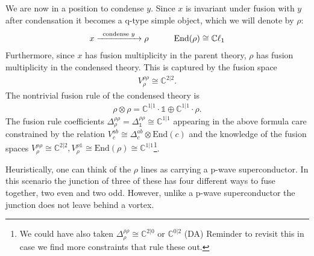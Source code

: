 \documentclass[12pt,a4paper]{article}
\newcounter{arrow}
\newcommand{\tp}{\otimes}
\newcommand{\unit}{\mathds{1}}
\newcommand{\cc}{\mathbb{C}}
\newcommand{\End}{\text{End}}
\newcommand{\dave}[1]{{\color{ao(english)}\footnotesize{(DA) #1}}}
\begin{document}
We are now in a position to condense $y$.
Since $x$ is invariant under fusion with $y$ after condensation it becomes a q-type simple object, which we will denote by $\rho$:
\begin{align}
x \xrightarrow{\;\; \text{condense $y$\;\;}} \rho \quad \quad \quad \text{End}(\rho) \cong \mathbb{C} \ell_1
\end{align}
Furthermore, since $x$ has fusion multiplicity in the parent theory, $\rho$ has fusion multiplicity in the condensed theory.
This is captured by the fusion space
\begin{align}
V^{\rho \rho}_\rho \cong \mathbb{C}^{2|2}.
\end{align}
The nontrivial fusion rule of the condensed theory is
\begin{align}
\rho \tp \rho = \mathbb{C}^{1|1}\cdot \mathds{1} \oplus \mathbb{C}^{1|1} \cdot \rho.
\end{align}
The fusion rule coefficients $\Delta^{\rho\rho}_\rho = \Delta^{\rho\rho}_\unit \cong \cc^{1|1}$ appearing in the above formula care constrained by the relation $V^{ab}_c \cong \Delta^{ab}_c \tp \End(c)$ and the knowledge of the fusion spaces $V^{\rho\rho}_\rho \cong \cc^{2|2}, V^{\rho \unit}_\rho \cong \End(\rho) \cong \cc^{1|1}$\footnote{We could have also taken $\Delta^{\rho \rho}_\rho \cong \cc^{2|0}$ or $ \cc^{0|2}$
\dave{Reminder to revisit this in case we find more constraints that rule these out.}}. 

Heuristically, one can think of the $\rho$ lines as carrying a p-wave superconductor.
In this scenario the junction of three of these has four different ways to fuse together, two even and two odd. 
However, unlike a p-wave superconductor the junction does not leave behind a vortex. 

\end{document}
